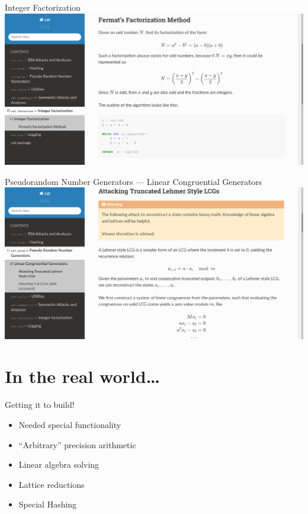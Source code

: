 \documentclass[10pt,aspectratio=169,table,usenames,dvipsnames,table]{beamer}
\begin{document}
\begin{frame}{Integer Factorization}
  \includegraphics[width=\textwidth, height=0.8\textheight, keepaspectratio]{fermat_doc.png}
\end{frame}

\begin{frame}{Pseudorandom Number Generators --- Linear Congruential Generators}
  \includegraphics[width=\textwidth, height=0.8\textheight, keepaspectratio]{lcg_doc.png}
\end{frame}

\section{In the real world\ldots}

\begin{frame}{Getting it to build!}
  \begin{itemize}
    \item Needed special functionality
    \item ``Arbitrary'' precision arithmetic
    \item Linear algebra solving
    \item Lattice reductions
    \item Special Hashing
    \vspace{1em}
    \vspace{1em}
  \end{itemize}
\end{frame}
\end{document}
